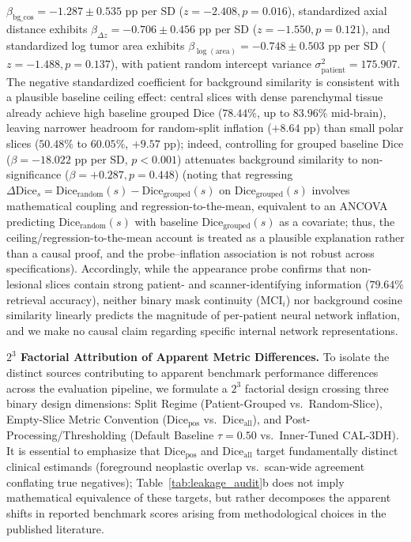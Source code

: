 \documentclass[11pt,a4paper]{article}
\begin{document}
$\beta_{\text{bg\_cos}} = -1.287 \pm 0.535\text{ pp}$ per SD ($z = -2.408, p = 0.016$), standardized axial distance exhibits $\beta_{\Delta z} = -0.706 \pm 0.456\text{ pp}$ per SD ($z = -1.550, p = 0.121$), and standardized log tumor area exhibits $\beta_{\log(\text{area})} = -0.748 \pm 0.503\text{ pp}$ per SD ($z = -1.488, p = 0.137$), with patient random intercept variance $\sigma_{\text{patient}}^2 = 175.907$. The negative standardized coefficient for background similarity is consistent with a plausible baseline ceiling effect: central slices with dense parenchymal tissue already achieve high baseline grouped Dice ($78.44\%$, up to $83.96\%$ mid-brain), leaving narrower headroom for random-split inflation ($+8.64\text{ pp}$) than small polar slices ($50.48\%$ to $60.05\%$, $+9.57\text{ pp}$); indeed, controlling for grouped baseline Dice ($\beta = -18.022\text{ pp}$ per SD, $p < 0.001$) attenuates background similarity to non-significance ($\beta = +0.287, p = 0.448$) (noting that regressing $\Delta\text{Dice}_s = \text{Dice}_{\text{random}}(s) - \text{Dice}_{\text{grouped}}(s)$ on $\text{Dice}_{\text{grouped}}(s)$ involves mathematical coupling and regression-to-the-mean, equivalent to an ANCOVA predicting $\text{Dice}_{\text{random}}(s)$ with baseline $\text{Dice}_{\text{grouped}}(s)$ as a covariate; thus, the ceiling/regression-to-the-mean account is treated as a plausible explanation rather than a causal proof, and the probe--inflation association is not robust across specifications). Accordingly, while the appearance probe confirms that non-lesional slices contain strong patient- and scanner-identifying information ($79.64\%$ retrieval accuracy), neither binary mask continuity ($\text{MCI}_i$) nor background cosine similarity linearly predicts the magnitude of per-patient neural network inflation, and we make no causal claim regarding specific internal network representations.

\noindent\textbf{$2^3$ Factorial Attribution of Apparent Metric Differences.}
To isolate the distinct sources contributing to apparent benchmark performance differences across the evaluation pipeline, we formulate a $2^3$ factorial design crossing three binary design dimensions: Split Regime (Patient-Grouped vs.\ Random-Slice), Empty-Slice Metric Convention ($\text{Dice}_{\text{pos}}$ vs.\ $\text{Dice}_{\text{all}}$), and Post-Processing/Thresholding (Default Baseline $\tau=0.50$ vs.\ Inner-Tuned CAL-3DH). It is essential to emphasize that $\text{Dice}_{\text{pos}}$ and $\text{Dice}_{\text{all}}$ target fundamentally distinct clinical estimands (foreground neoplastic overlap vs.\ scan-wide agreement conflating true negatives); Table~\ref{tab:leakage_audit}b does not imply mathematical equivalence of these targets, but rather decomposes the apparent shifts in reported benchmark scores arising from methodological choices in the published literature.
\end{document}
